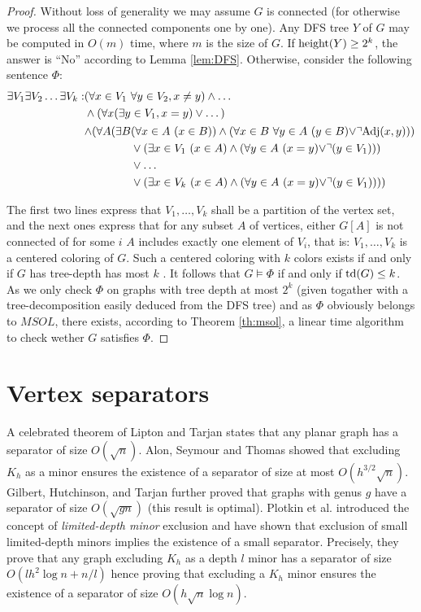 \documentclass[a4paper]{amsart}
\theoremstyle{definition}
\theoremstyle{remark}
\DeclareMathOperator\depth{{\rm td}}
\DeclareMathOperator\height{{\rm height}}
\begin{document}
\begin{proof}
Without loss of generality we may assume $G$ is connected (for
otherwise we process all the connected components one by one).
Any DFS tree $Y$ of $G$ may be computed in $O(m)$ time, where $m$ is
the size of $G$. If $\height(Y)\geq 2^k$, the answer is ``No''
according to Lemma \ref{lem:DFS}.
Otherwise, consider the following
sentence $\Phi$:
$$
\begin{aligned}
\exists V_1\exists V_2\dots\exists V_k: &(\forall x\in V_1\ \forall y\in V_2, x\neq y)\wedge\dots\\
&\wedge (\forall x (\exists y\in V_1, x=y)\vee \dots )\\
&\begin{aligned}
\wedge (\forall A (\exists B &(\forall x\in A\ (x\in B))\wedge (\forall
x\in B\ 
\forall y\in A\ (y\in B)\vee\urcorner {\rm Adj}(x,y)))\\
&\vee (\exists x\in V_1\ (x\in A) \wedge (\forall y\in A\
(x=y)\vee\urcorner(y\in V_1)))\\
&\vee\dots\\
&\vee (\exists x\in V_k\ (x\in A) \wedge (\forall y\in A\
(x=y)\vee\urcorner(y\in V_1))))
\end{aligned}
\end{aligned}
$$

The first two lines express that $V_1,\dots,V_k$ shall be a partition
of the vertex set, and the next ones express that for any subset $A$
of vertices, either $G[A]$ is not connected of for some $i$ $A$
includes exactly one element of $V_i$, that is: $V_1,\dots,V_k$ is a
centered coloring of $G$. Such a centered coloring with $k$ colors
exists if and only if $G$ has tree-depth has most $k$
\cite{Taxi_tdepth}. It follows that $G\vDash\Phi$ if and only if
$\depth(G)\leq k$. As we only check $\Phi$ on graphs with tree depth
at most $2^k$ (given togather with a tree-decomposition easily deduced
from the DFS tree) and as $\Phi$ obviously belongs to $MSOL$, there exists,
according to Theorem \ref{th:msol}, a linear time algorithm to check
wether $G$ satisfies $\Phi$.
\end{proof}

\section{Vertex separators}
A celebrated theorem of Lipton and Tarjan \cite{lipton79} states that
any planar graph has a separator of size $O(\sqrt{n})$. Alon, Seymour
and Thomas \cite{AST90} showed that excluding $K_h$ as a minor ensures
the existence of a separator of size at most
$O(h^{3/2}\sqrt{n})$. Gilbert, Hutchinson, and Tarjan \cite{gilbert84} further proved
that graphs with genus $g$ have a separator of size $O(\sqrt{gn})$
(this result is optimal).
Plotkin et al. \cite{shallow} introduced the concept of {\em
limited-depth minor} exclusion and have shown that exclusion of small
limited-depth minors implies the existence of a small separator.
Precisely, they prove that any graph excluding $K_h$ as a depth $l$
minor has a separator of size $O(lh^2\log n+n/l)$ hence proving that
excluding a $K_h$ minor ensures the existence of a separator of size 
$O(h\sqrt{n}\log n)$. 
\end{document}
